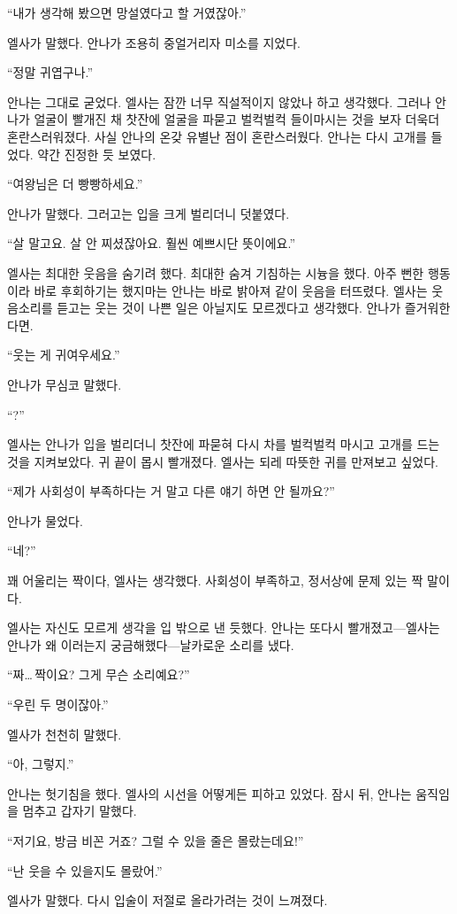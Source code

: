 ``내가 생각해 봤으면 망설였다고 할 거였잖아.''

엘사가 말했다. 안나가 조용히 중얼거리자 미소를 지었다.

``정말 귀엽구나.''

안나는 그대로 굳었다. 엘사는 잠깐 너무 직설적이지 않았나 하고 생각했다. 그러나 안나가 얼굴이 빨개진 채 찻잔에 얼굴을 파묻고 벌컥벌컥 들이마시는 것을 보자 더욱더 혼란스러워졌다. 사실 안나의 온갖 유별난 점이 혼란스러웠다. 안나는 다시 고개를 들었다. 약간 진정한 듯 보였다.

``여왕님은 더 빵빵하세요.''

안나가 말했다. 그러고는 입을 크게 벌리더니 덧붙였다.

``살 말고요. 살 안 찌셨잖아요. 훨씬 예쁘시단 뜻이에요.''

엘사는 최대한 웃음을 숨기려 했다. 최대한 숨겨 기침하는 시늉을 했다. 아주 뻔한 행동이라 바로 후회하기는 했지마는 안나는 바로 밝아져 같이 웃음을 터뜨렸다. 엘사는 웃음소리를 듣고는 웃는 것이 나쁜 일은 아닐지도 모르겠다고 생각했다. 안나가 즐거워한다면.

``웃는 게 귀여우세요.''

안나가 무심코 말했다.

``?''

엘사는 안나가 입을 벌리더니 찻잔에 파묻혀 다시 차를 벌컥벌컥 마시고 고개를 드는 것을 지켜보았다. 귀 끝이 몹시 빨개졌다. 엘사는 되레 따뜻한 귀를 만져보고 싶었다.

``제가 사회성이 부족하다는 거 말고 다른 얘기 하면 안 될까요?''

안나가 물었다.

``네?''

꽤 어울리는 짝이다, 엘사는 생각했다. 사회성이 부족하고, 정서상에 문제 있는 짝 말이다.

엘사는 자신도 모르게 생각을 입 밖으로 낸 듯했다. 안나는 또다시 빨개졌고—엘사는 안나가 왜 이러는지 궁금해했다—날카로운 소리를 냈다.

``짜\ldots\,짝이요? 그게 무슨 소리예요?''

``우린 두 명이잖아.''

엘사가 천천히 말했다.

``아, 그렇지.''

안나는 헛기침을 했다. 엘사의 시선을 어떻게든 피하고 있었다. 잠시 뒤, 안나는 움직임을 멈추고 갑자기 말했다.

``저기요, 방금 비꼰 거죠? 그럴 수 있을 줄은 몰랐는데요!''

``난 웃을 수 있을지도 몰랐어.''

엘사가 말했다. 다시 입술이 저절로 올라가려는 것이 느껴졌다.

